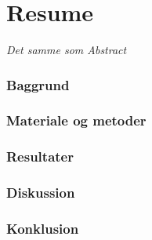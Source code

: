 \chapter{Resume}
\textit{Det samme som Abstract}

\subsection{Baggrund}

\subsection{Materiale og metoder}

\subsection{Resultater}

\subsection{Diskussion}

\subsection{Konklusion}